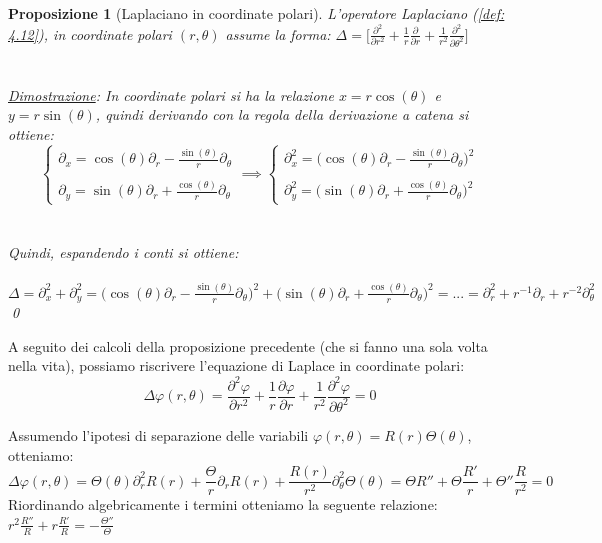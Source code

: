 \documentclass[a4paper,12pt]{report}
\newtheorem{proposizione}{Proposizione}[chapter]
\newcommand{\pd}[2]{\frac{\partial #1}{\partial #2}}
\newcommand{\pdd}[2]{\frac{\partial^2 #1}{\partial #2^2}}
\begin{document}
\begin{proposizione}[Laplaciano in coordinate polari]\label{prop: 4.4}
    L'operatore Laplaciano (\ref{def: 4.12}), in coordinate polari $(r,\theta)$ assume la forma: $\Delta=\bigg[\displaystyle\pdd{}{r}+\frac{1}{r}\pd{}{r}+\frac{1}{r^2}\pdd{}{\theta}\bigg]$
    \\
    \\
    \\\underline{Dimostrazione}: In coordinate polari si ha la relazione $x=r\cos(\theta)$ e $y=r\sin(\theta)$, quindi derivando con la regola della derivazione a catena si ottiene:
    \[\begin{cases}
        \partial_x=\cos(\theta)\partial_r-\displaystyle\frac{\sin(\theta)}{r}\partial_\theta
        \\
        \\\partial_y=\sin(\theta)\partial_r+\frac{\cos(\theta)}{r}\partial_\theta
    \end{cases}\implies\begin{cases}
        \partial_x^2=\bigg(\cos(\theta)\partial_r-\displaystyle\frac{\sin(\theta)}{r}\partial_\theta\bigg)^2
        \\
        \\\partial_y^2=\bigg(\sin(\theta)\partial_r+\frac{\cos(\theta)}{r}\partial_\theta\bigg)^2
    \end{cases}\]
    \\
    \\Quindi, espandendo i conti si ottiene: \\
    \\\mbox{$\Delta=\partial_x^2+\partial_y^2=\bigg(\cos(\theta)\partial_r-\displaystyle\frac{\sin(\theta)}{r}\partial_\theta\bigg)^2+\bigg(\sin(\theta)\partial_r+\frac{\cos(\theta)}{r}\partial_\theta\bigg)^2=...=\partial_r^2+r^{-1}\partial_r+r^{-2}\partial_\theta^2$}\qed
\end{proposizione}
A seguito dei calcoli della proposizione precedente (che si fanno una sola volta nella vita), possiamo riscrivere l'equazione di Laplace in coordinate polari:
\[\Delta\varphi(r,\theta)=\pdd{\varphi}{r}+\frac{1}{r}\pd{\varphi}{r}+\frac{1}{r^2}\pdd{\varphi}{\theta}=0\]

Assumendo l'ipotesi di separazione delle variabili $\varphi(r,\theta)=R(r)\Theta (\theta)$, otteniamo:
\[\Delta\varphi(r,\theta)=\Theta(\theta)\partial_r^2R(r)+\frac{\Theta}{r}\partial_rR(r)+\frac{R(r)}{r^2}\partial_\theta^2\Theta(\theta)=\Theta R''+\Theta\frac{R'}{r}+\Theta''\frac{R}{r^2}=0\]
Riordinando algebricamente i termini otteniamo la seguente relazione: $r^2\displaystyle\frac{R''}{R}+r\frac{R'}{R}=-\frac{\Theta''}{\Theta}$
\end{document}
